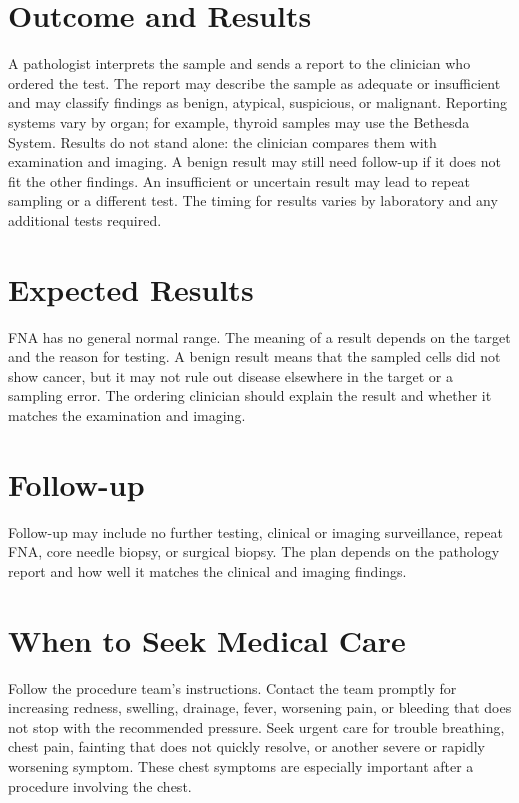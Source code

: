 \section*{Outcome and Results}
A pathologist interprets the sample and sends a report to the clinician who ordered the test. The report may describe the sample as adequate or insufficient and may classify findings as benign, atypical, suspicious, or malignant. Reporting systems vary by organ; for example, thyroid samples may use the Bethesda System. Results do not stand alone: the clinician compares them with examination and imaging. A benign result may still need follow-up if it does not fit the other findings. An insufficient or uncertain result may lead to repeat sampling or a different test. The timing for results varies by laboratory and any additional tests required.

\section*{Expected Results}
FNA has no general normal range. The meaning of a result depends on the target and the reason for testing. A benign result means that the sampled cells did not show cancer, but it may not rule out disease elsewhere in the target or a sampling error. The ordering clinician should explain the result and whether it matches the examination and imaging.

\section*{Follow-up}
Follow-up may include no further testing, clinical or imaging surveillance, repeat FNA, core needle biopsy, or surgical biopsy. The plan depends on the pathology report and how well it matches the clinical and imaging findings.

\section*{When to Seek Medical Care}
Follow the procedure team's instructions. Contact the team promptly for increasing redness, swelling, drainage, fever, worsening pain, or bleeding that does not stop with the recommended pressure. Seek urgent care for trouble breathing, chest pain, fainting that does not quickly resolve, or another severe or rapidly worsening symptom. These chest symptoms are especially important after a procedure involving the chest.

